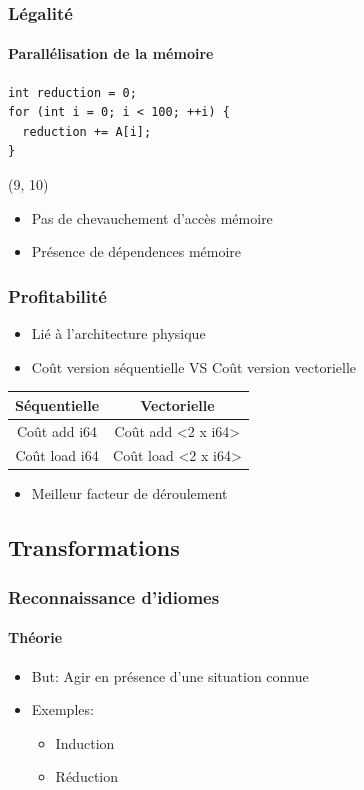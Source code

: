 \documentclass{beamer}
\begin{document}
\begin{frame}[fragile]
\frametitle{Légalité}
\framesubtitle{Parallélisation de la mémoire}
\begin{lstlisting}
int reduction = 0;
for (int i = 0; i < 100; ++i) {
  reduction += A[i];
}
\end{lstlisting}

\begin{textblock}{6}(9, 10)
	\begin{itemize}
	\item<2->[\checkmark] Pas de chevauchement d'accès mémoire
	\item<3->[$\times$] Présence de dépendences mémoire
	\end{itemize}
\end{textblock}
\end{frame}

\begin{frame}
\frametitle{Profitabilité}
\begin{itemize}
\item Lié à l'architecture physique
\item Coût version séquentielle VS Coût version vectorielle
\end{itemize}

\begin{center}
\begin{tabular}{ | c | c | }
  \hline
  Séquentielle & Vectorielle \\
  \hline
  Coût add i64 & Coût add \textless2 x i64\textgreater \\
  \hline
  Coût load i64 & Coût load \textless2 x i64\textgreater \\
  \hline
\end{tabular}
\end{center}

\begin{itemize}
\item Meilleur facteur de déroulement
\end{itemize}
\end{frame}

\subsection{Transformations}
\begin{frame}
\frametitle{Reconnaissance d'idiomes}
\framesubtitle{Théorie}
\begin{itemize}
\item But: Agir en présence d'une situation connue
\item Exemples:
\begin{itemize}
\item Induction
\item Réduction
\end{itemize}
\end{itemize}
\end{frame}
\end{document}
